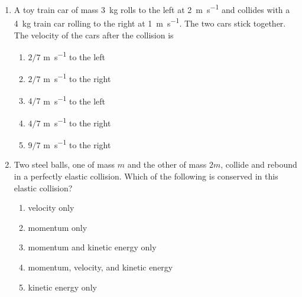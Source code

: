 \documentclass{../../../oss-classkick}
\begin{document}
\genheader


\genmultidirections

\gengravity

\raggedcolumns
\begin{multicols}{2}

  \begin{enumerate}[leftmargin=18pt]

  \item A toy train car of mass \SI{3}{\kilo\gram} rolls to the left at
    \SI{2}{\metre\per\second} and collides with a \SI{4}{\kilo\gram} train
    car rolling to the right at \SI{1}{\metre\per\second}. The two cars stick
    together. The velocity of the cars after the collision is
    \begin{enumerate}[nosep,leftmargin=18pt,label=(\Alph*)]
    \item $2/7$ \si{\metre\per\second} to the left
    \item $2/7$ \si{\metre\per\second} to the right
    \item $4/7$ \si{\metre\per\second} to the left
    \item $4/7$ \si{\metre\per\second} to the right
    \item $9/7$ \si{\metre\per\second} to the right
    \end{enumerate}
    \vspace{.7in}
    
  \item Two steel balls, one of mass $m$ and the other of mass $2m$, collide and
    rebound in a perfectly elastic collision. Which of the following is
    conserved in this elastic collision?
    \begin{enumerate}[nosep,leftmargin=18pt,label=(\Alph*)]
    \item velocity only
    \item momentum only
    \item momentum and kinetic energy only
    \item momentum, velocity, and kinetic energy
    \item kinetic energy only
    \end{enumerate}
    \vspace{.7in}
    

\end{enumerate}
\end{multicols}
\end{document}
